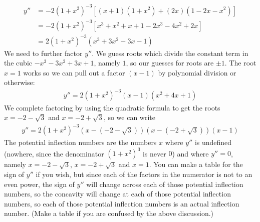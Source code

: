 \documentclass{article}
\begin{document}
\begin{enumerate}
\begin{align*}
    y'' &= -2(1+x^2)^{-3} \left[(x+1)(1+x^2) +(2x)(1-2x-x^2)\right]
    \\
    &= -2(1+x^2)^{-3} \left[x^3+x^2+x+1-2x^3-4x^2+2x\right]
    \\
    &= 2 (1+x^2)^{-3} (x^3+3x^2-3x-1)
  \end{align*}
  We need to further factor $y''$.  We guess roots which divide the
  constant term in the cubic $-x^3-3x^2+3x+1$, namely $1$, so our
  guesses for roots are $\pm 1$.  The root $x=1$ works so we can pull
  out a factor $(x-1)$ by polynomial division or otherwise:
  \begin{align*}
    y'' = 2(1+x^2)^{-3} (x-1)(x^2+4x+1)
  \end{align*}
  We complete factoring by using the quadratic formula to get the
  roots $x=-2-\sqrt{3}$ and $x=-2+\sqrt{3}$, so we can write
  \begin{align*}
    y'' = 2(1+x^2)^{-3} (x-(-2-\sqrt{3}))(x-(-2+\sqrt{3}))(x-1)
  \end{align*}
  The potential inflection numbers are the numbers $x$ where $y''$ is
  undefined (nowhere, since the denominator $(1+x^2)^3$ is never $0$)
  and where $y''=0$, namely $x=-2-\sqrt{3}$, $x=-2+\sqrt{3}$ and
  $x=1$.  You can make a table for the sign of $y''$ if you wish, but
  since each of the factors in the numerator is not to an even power,
  the sign of $y''$ will change across each of those potential
  inflection numbers, so the concavity will change at each of those
  potential inflection numbers, so each of those potential inflection
  numbers is an actual inflection number.  (Make a table if you are
  confused by the above discussion.)


\end{enumerate}
\end{document}
